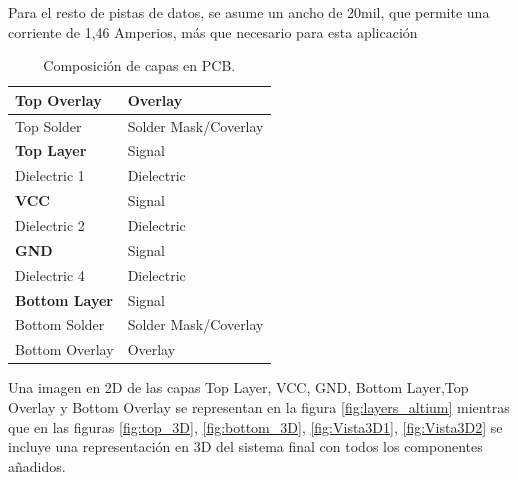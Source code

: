 Para el resto de pistas de datos, se asume un ancho de 20mil, que permite una corriente de 1,46 Amperios, más que necesario para esta aplicación


\begin{table}[H]
	\centering

	\begin{tabular}{|l|l|}
		\hline
		Top Overlay           & Overlay              \\ \hline
		Top Solder            & Solder Mask/Coverlay \\ \hline
		\textbf{Top Layer}    & Signal               \\ \hline
		Dielectric 1          & Dielectric           \\ \hline
		\textbf{VCC}          & Signal               \\ \hline
		Dielectric 2          & Dielectric           \\ \hline
		\textbf{GND}          & Signal               \\ \hline
		Dielectric 4          & Dielectric           \\ \hline
		\textbf{Bottom Layer} & Signal               \\ \hline
		Bottom Solder         & Solder Mask/Coverlay \\ \hline
		Bottom Overlay        & Overlay              \\ \hline
	\end{tabular}
	\caption{Composición de capas en PCB.}
    \label{tabla:layers_altium}
\end{table}



Una imagen en 2D de las capas Top Layer, VCC, GND, Bottom Layer,Top Overlay y Bottom Overlay se representan en la figura \ref{fig:layers_altium} mientras que en las figuras \ref{fig:top_3D}, \ref{fig:bottom_3D}, \ref{fig:Vista3D1}, \ref{fig:Vista3D2} se incluye una representación en 3D del sistema final con todos los componentes añadidos.


